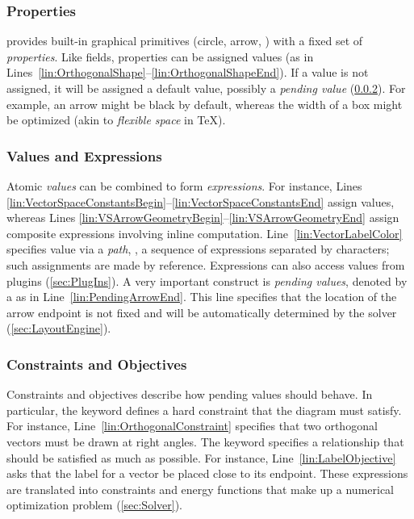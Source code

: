 \subsubsection{Properties}
\label{sec:Properties}

\Style{} provides built-in graphical primitives (circle, arrow, \etc{}) with a fixed set of \emph{properties}. Like fields, properties can be assigned values (as in Lines~\ref{lin:OrthogonalShape}--\ref{lin:OrthogonalShapeEnd}). If a value is not assigned, it will be assigned a default value, possibly a \emph{pending value} (\cref{sec:ValuesAndExpressions}).  For example, an arrow might be black by default, whereas the width of a box might be optimized (akin to \emph{flexible space} in \TeX).


\subsubsection{Values and Expressions}
\label{sec:ValuesAndExpressions}

Atomic \emph{values} can be combined to form \emph{expressions}.  For instance, Lines \ref{lin:VectorSpaceConstantsBegin}--\ref{lin:VectorSpaceConstantsEnd} assign values, whereas Lines \ref{lin:VSArrowGeometryBegin}--\ref{lin:VSArrowGeometryEnd} assign composite expressions involving inline computation.  Line~\ref{lin:VectorLabelColor} specifies value via a \emph{path}, \ie, a sequence of expressions separated by  characters; such assignments are made by reference.  Expressions can also access values from plugins (\cref{sec:PlugIns}).  A very important construct is \emph{pending values}, denoted by a  as in Line~\ref{lin:PendingArrowEnd}.  This line specifies that the location of the arrow endpoint is not fixed and will be automatically determined by the solver (\cref{sec:LayoutEngine}).

\subsubsection{Constraints and Objectives}
\label{sec:ConstraintsAndObjectives}

Constraints and objectives describe how pending values should behave.  In particular, the  keyword defines a hard constraint that the diagram must satisfy. For instance, Line~\ref{lin:OrthogonalConstraint} specifies that two orthogonal vectors must be drawn at right angles.  The  keyword specifies a relationship that should be satisfied as much as possible. For instance, Line~\ref{lin:LabelObjective} asks that the label for a vector be placed close to its endpoint. These expressions are translated into constraints and energy functions that make up a numerical optimization problem (\cref{sec:Solver}).


